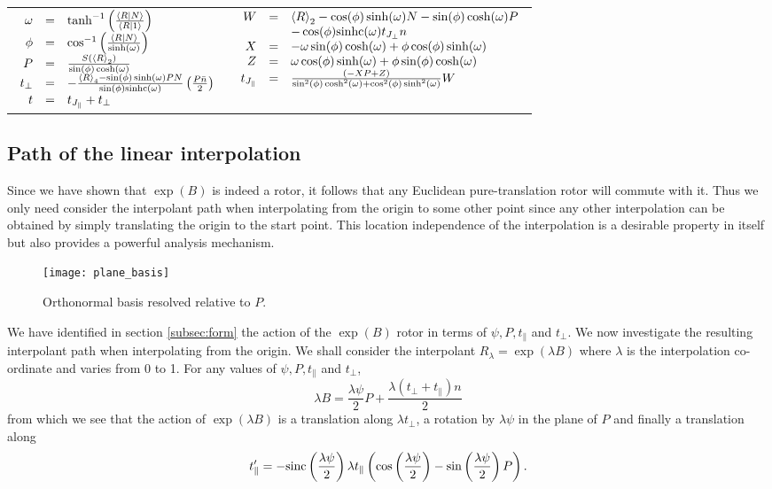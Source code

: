\begin{tabular}{ll}
$\begin{array}{rcl}
  \omega &=& \tanh^{-1}\left(\frac{\left<R|N\right>}{\left<R|1\right>}\right)\\
  \phi &=& \cos^{-1}\left(\frac{\left<R|N\right>}{\sinh(\omega)}\right)\\
  P &=& \frac{S(\left<R\right>_2)}{\sin(\phi)\cosh(\omega)}\\
  t_\perp &=& -\frac{\left<R\right>_4-\sin(\phi)\sinh(\omega)PN}{\sin(\phi)\mathrm{sinhc}(\omega)}\left(\frac{P\bar{n}}2\right)\\
  t &=& t_{J_\parallel} + t_\perp
\end{array}$ &
$\begin{array}{rcl}
  W &=& \left<R\right>_2 - \cos(\phi)\sinh(\omega)N - \sin(\phi)\cosh(\omega)P \\
  &&- \cos(\phi)\mathrm{sinhc}(\omega)t_{J_\perp} n\\
  X &=& -\omega\sin(\phi)\cosh(\omega) + \phi\cos(\phi)\sinh(\omega)\\
  Z &=&  \omega\cos(\phi)\sinh(\omega) + \phi\sin(\phi)\cosh(\omega)\\
  t_{J_\parallel} &=& \frac{(-XP+Z)}{\sin^2(\phi)\cosh^2(\omega) + \cos^2(\phi)\sinh^2(\omega)} W
\end{array}$
\end{tabular}

\subsection{Path of the linear interpolation}

Since we have shown that $\exp(B)$ is indeed a rotor, it follows that any
Euclidean pure-translation rotor will commute with it. Thus we only need consider the
interpolant path when interpolating from the origin to some other point since
any other interpolation can be obtained by simply translating the origin to
the start point. This location independence of the interpolation is a 
desirable property in itself but also provides a powerful analysis mechanism.

\begin{figure}\centering
\texttt{[image: plane\_basis]}
\caption{\label{fig:plane_basis}Orthonormal basis resolved relative to $P$.}
\end{figure}

We have identified in section \ref{subsec:form} the action of the $\exp(B)$
rotor in terms of $\psi, P, t_\parallel$ and $t_\perp$. We now investigate the resulting interpolant
path when interpolating from the origin. We shall consider the interpolant
$R_\lambda = \exp(\lambda B)$ where $\lambda$ is the interpolation co-ordinate and
varies from 0 to 1. For any values of $\psi, P, t_\parallel$ and $t_\perp$,
\[
\lambda B = \frac{\lambda \psi}{2} P + \frac{\lambda (t_\perp + t_\parallel) n}{2}
\]
from which we see that the action of $\exp(\lambda B)$ is a translation along $\lambda t_\perp$, a rotation by
$\lambda \psi$ in the plane of $P$ and finally a translation along
\[
t'_\parallel =- \mathrm{sinc}\left(\frac{\lambda\psi}{2}\right)
\lambda t_\parallel
\left(
\cos\left(\frac{\lambda \psi}{2}\right) -
\sin\left(\frac{\lambda \psi}{2}\right) P 
\right).
\]

